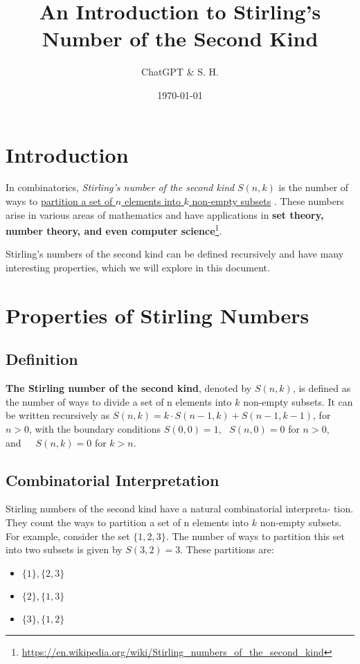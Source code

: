 \documentclass{article}
\title{An Introduction to Stirling’s Number of the
Second Kind}
\author{ChatGPT \& S. H.}
\date{\today}
\begin{document}
\maketitle
\section{Introduction}
In combinatorics, \textit{Stirling’s number of the second kind} $S(n, k)$ is the number
of ways to \underline{partition a set of $n$ elements into $k$ non-empty subsets} \cite{1}. These
numbers arise in various areas of mathematics and have applications in \textbf{set
theory, number theory, and even computer science}\footnote{\url{https://en.wikipedia.org/wiki/Stirling_numbers_of_the_second_kind}}.

Stirling’s numbers of the second kind can be defined recursively and have
many interesting properties, which we will explore in this document.

\section{Properties of Stirling Numbers}
\subsection{Definition}
\textbf{The Stirling number of the second kind}, denoted by $S(n, k)$, is defined
as the number of ways to divide a set of n elements into $k$ non-empty subsets.
It can be written recursively as $S(n, k) = k \cdot S(n - 1, k) + S(n - 1, k - 1)$, for
$n > 0$, with the boundary conditions $S(0, 0) = 1,\ \ \  S(n, 0) = 0$ for $n > 0$,
and\ \ \  $S(n, k) = 0$ for $k > n$.

\subsection{Combinatorial Interpretation}
Stirling numbers of the second kind have a natural combinatorial interpreta-
tion. They count the ways to partition a set of n elements into $k$ non-empty
subsets. For example, consider the set $\{1, 2, 3\}$. The number of ways to
partition this set into two subsets is given by $S(3, 2) = 3$. These partitions
are:
\begin{itemize}
    \item $\{1\}, \{2, 3\}$
    \item $\{2\}, \{1, 3\}$
    \item $\{3\}, \{1, 2\}$
\end{itemize}
\end{document}
